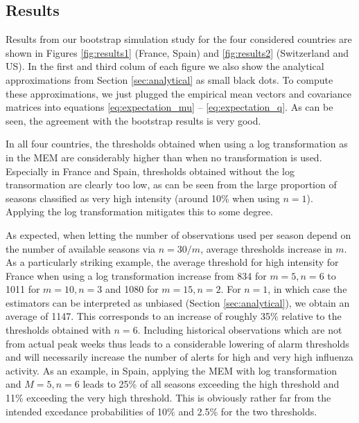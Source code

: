 \documentclass{article}
\begin{document}
\subsection{Results}

Results from our bootstrap simulation study for the four considered countries are shown in Figures \ref{fig:results1} (France, Spain) and \ref{fig:results2} (Switzerland and US). In the first and third colum of each figure we also show the analytical approximations from Section \ref{sec:analytical} as small black dots. To compute these approximations, we just plugged the empirical mean vectors and covariance matrices into equations \eqref{eq:expectation_mu} -- \eqref{eq:expectation_q}. As can be seen, the agreement with the bootstrap results is very good.

In all four countries, the thresholds obtained when using a log transformation as in the MEM are considerably higher than when no transformation is used. Especially in France and Spain, thresholds obtained without the log transormation are clearly too low, as can be seen from the large proportion of seasons classified as very high intensity (around 10\% when using $n = 1$). Applying the log transformation mitigates this to some degree. 

As expected, when letting the number of observations used per season depend on the number of available seasons via $n = 30/m$, average thresholds increase in $m$. As a particularly striking example, the average threshold for high intensity for France when using a log transformation increase from %
834 for $m = 5, n = 6$ to 1011 for $m = 10, n = 3$ and 1080 for $m = 15, n = 2$. For $n = 1$, in which case the estimators can be interpreted as unbiased (Section \ref{sec:analytical}), we obtain an average of 1147. This corresponds to an increase of roughly 35\% relative to the thresholds obtained with $n = 6$. Including historical observations which are not from actual peak weeks thus leads to a considerable lowering of alarm thresholds and will necessarily increase the number of alerts for high and very high influenza activity. As an example, in Spain, applying the MEM with log transformation and $M = 5, n = 6$ leads to 25\% of all seasons exceeding the high threshold and 11\% exceeding the very high threshold. This is obviously rather far from the intended excedance probabilities of 10\% and 2.5\% for the two thresholds.
\end{document}
